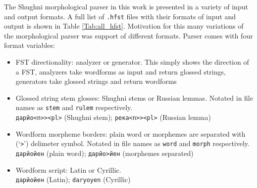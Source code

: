 The Shughni morphological parser in this work is presented in a variety of input and output formats. A full list of \texttt{.hfst} files with their formats of input and output is shown in Table \ref{Tab:all_hfst}. Motivation for this many variations of the morphological parser was support of different formats. Parser comes with four format variables:
\begin{itemize}
    \item FST directionality: analyzer or generator. This simply shows the direction of a FST, analyzers take wordforms as input and return glossed strings, generators take glossed strings and return wordforms
    \item Glossed string stem glosses: Shughni stems or Russian lemmas. Notated in file names as \texttt{stem} and \texttt{rulem} respectively.\\
    \texttt{дарйо<n>><pl>} (Shughni stem); \texttt{река<n>><pl>} (Russian lemma)
    \item Wordform morpheme borders: plain word or morphemes are separated with (`\texttt{>}') delimeter symbol. Notated in file names as \texttt{word} and \texttt{morph} respectively.\\ 
    \texttt{дарйойен} (plain word); \texttt{дарйо>йен} (morphemes separated)
    \item Wordform script: Latin or Cyrillic.\\
    \texttt{дарйойен} (Latin); \texttt{daryoyen} (Cyrillic)
\end{itemize}


